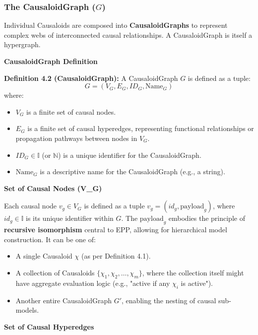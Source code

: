 \subsubsection[The CausaloidGraph (\(G\))]{The CausaloidGraph (\(G\))}
\label{ssec:causaloidgraph_formal} %

Individual Causaloids are composed into \textbf{CausaloidGraphs} to represent complex webs of interconnected causal relationships. A CausaloidGraph is itself a hypergraph.


\textbf{CausaloidGraph Definition}

\textbf{Definition 4.2 (CausaloidGraph):} A CausaloidGraph \( G \) is defined as a tuple:
\[ G = (V_G, E_G, ID_G, \text{Name}_G) \]
where:
\begin{itemize}
    \item \( V_G \) is a finite set of causal nodes.
    \item \( E_G \) is a finite set of causal hyperedges, representing functional relationships or propagation pathways between nodes in \(V_G\).
    \item \( ID_G \in \mathbb{I} \) (or \(\mathbb{N}\)) is a unique identifier for the CausaloidGraph.
    \item \( \text{Name}_G \) is a descriptive name for the CausaloidGraph (e.g., a string).
\end{itemize}


\textbf{Set of Causal Nodes (V\_G)}

Each causal node \( v_g \in V_G \) is defined as a tuple \(v_g = (id_g, \text{payload}_g)\), where \(id_g \in \mathbb{I}\) is its unique identifier within \(G\).
The \( \text{payload}_g \) embodies the principle of \textbf{recursive isomorphism} central to EPP, allowing for hierarchical model construction. It can be one of:
\begin{itemize}
    \item A single Causaloid \(\chi\) (as per Definition 4.1).
    \item A collection of Causaloids \(\{\chi_1, \chi_2, \dots, \chi_m\}\), where the collection itself might have aggregate evaluation logic (e.g., "active if any \(\chi_i\) is active").
    \item Another entire CausaloidGraph \(G'\), enabling the nesting of causal sub-models.
\end{itemize}


\textbf{Set of Causal Hyperedges}


